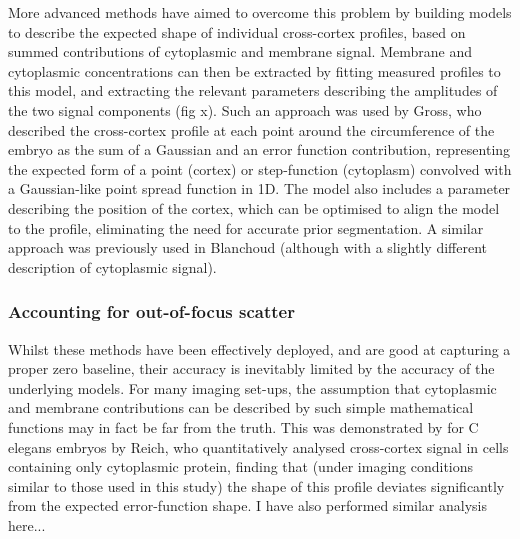 \documentclass[12pt]{"article"}
\begin{document}
More advanced methods have aimed to overcome this problem by building models to describe the expected shape of individual cross-cortex profiles, based on summed contributions of cytoplasmic and membrane signal. Membrane and cytoplasmic concentrations can then be extracted by fitting measured profiles to this model, and extracting the relevant parameters describing the amplitudes of the two signal components (fig x). Such an approach was used by Gross, who described the cross-cortex profile at each point around the circumference of the embryo as the sum of a Gaussian and an error function contribution, representing the expected form of a point (cortex) or step-function (cytoplasm) convolved with a Gaussian-like point spread function in 1D. The model also includes a parameter describing the position of the cortex, which can be optimised to align the model to the profile, eliminating the need for accurate prior segmentation. A similar approach was previously used in Blanchoud (although with a slightly different description of cytoplasmic signal).\\

\subsubsection{Accounting for out-of-focus scatter}

Whilst these methods have been effectively deployed, and are good at capturing a proper zero baseline, their accuracy is inevitably limited by the accuracy of the underlying models. For many imaging set-ups, the assumption that cytoplasmic and membrane contributions can be described by such simple mathematical functions may in fact be far from the truth. This was demonstrated by for C elegans embryos by Reich, who quantitatively analysed cross-cortex signal in cells containing only cytoplasmic protein, finding that (under imaging conditions similar to those used in this study) the shape of this profile deviates significantly from the expected error-function shape. I have also performed similar analysis here...\\



\end{document}
